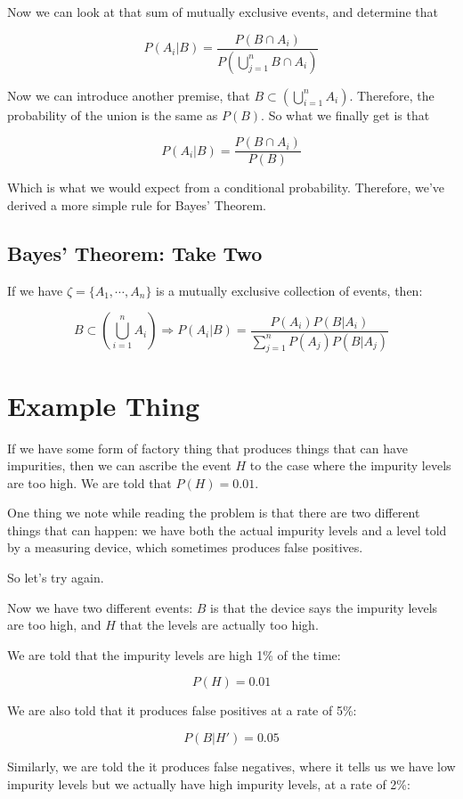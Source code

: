 \documentclass{article}
\begin{document}
Now we can look at that sum of mutually exclusive events, and
determine that

\[
P(A_i|B)=\dfrac{P(B\cap A_i)}{P\left(\bigcup\limits_{j=1}^nB\cap A_i\right)}
\]

Now we can introduce another premise, that
$B\subset\left(\bigcup\limits_{i=1}^nA_i\right)$. Therefore, the
probability of the union is the same as $P(B)$. So what we finally get
is that

\[
P(A_i|B)=\dfrac{P(B\cap A_i)}{P(B)}
\]

Which is what we would expect from a conditional
probability. Therefore, we've derived a more simple rule for Bayes'
Theorem.

\subsection*{Bayes' Theorem: Take Two}

If we have $\zeta=\{A_1,\cdots,A_n\}$ is a mutually exclusive
collection of events, then:

\[
B\subset\left(\bigcup\limits_{i=1}^nA_i\right)\Rightarrow P(A_i|B)=\dfrac{P(A_i)P(B|A_i)}{\sum\limits_{j=1}^nP(A_j)P(B|A_j)}
\]

\section*{Example Thing}

If we have some form of factory thing that produces things that can
have impurities, then we can ascribe the event $H$ to the case where
the impurity levels are too high. We are told that $P(H)=0.01$.

One thing we note while reading the problem is that there are two
different things that can happen: we have both the actual impurity
levels and a level told by a measuring device, which sometimes
produces false positives.

So let's try again.

Now we have two different events: $B$ is that the device says the
impurity levels are too high, and $H$ that the levels are actually too
high.

We are told that the impurity levels are high 1\% of the time:

\[
P(H)=0.01
\]

We are also told that it produces false positives at a rate of 5\%:

\[
P(B|H')=0.05
\]

Similarly, we are told the it produces false negatives, where it tells
us we have low impurity levels but we actually have high impurity
levels, at a rate of 2\%:
\end{document}
